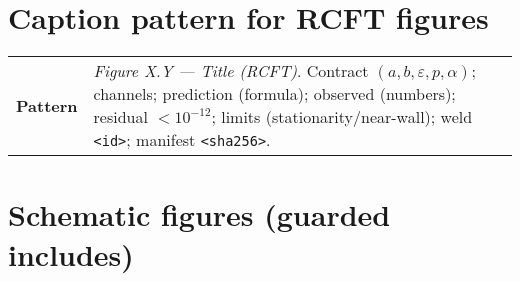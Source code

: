 \section{Caption pattern for RCFT figures}
\begin{eqbox}
\small
\begin{tabularx}{\linewidth}{@{}>{\bfseries}l X@{}}
Pattern & \emph{Figure X.Y — Title (RCFT)}. Contract $(a,b,\varepsilon,p,\alpha)$; channels; prediction (formula); observed (numbers); residual $<10^{-12}$; limits (stationarity/near-wall); weld \texttt{<id>}; manifest \texttt{<sha256>}. \\
\end{tabularx}
\end{eqbox}

\section{Schematic figures (guarded includes)}

